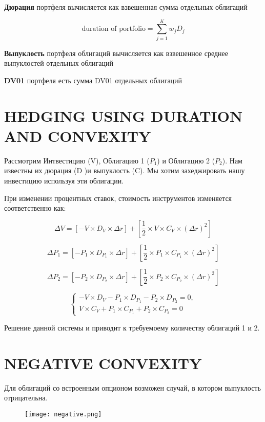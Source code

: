 \documentclass[a4paper,12pt]{article}
\begin{document}
\textbf{Дюрация} портфеля вычисляется как взвешенная сумма отдельных облигаций

\[ \text{duration of portfolio} = \sum_{j=1}^{K} w_j D_j \]

\textbf{Выпуклость} портфеля облигаций вычисляется как взвешенное среднее выпуклостей отдельных облигаций

\textbf{DV01} портфеля есть сумма  DV01 отдельных облигаций 

\section{HEDGING USING DURATION AND CONVEXITY}

Рассмотрим Интвестицию (V), Облигацию 1 ($P_1$) и Облигацию 2 ($P_2$). Нам известны их дюрация (D )и выпуклость (C). Мы хотим захеджировать нашу инвестицию используя эти облигации.

При изменении процентных ставок, стоимость инструментов изменяется соответственно как:

\[ \Delta V = [-V \times D_V \times \Delta r ] + [\frac{1}{2} \times V \times C_V \times (\Delta r)^2]  \]


\[ \Delta P_1 = [-P_1 \times D_{P_1} \times \Delta r ] + [\frac{1}{2} \times P_1 \times C_{P_1} \times (\Delta r)^2]  \]


\[ \Delta P_2 = [-P_2 \times D_{P_2} \times \Delta r ] + [\frac{1}{2} \times P_2 \times C_{P_2} \times (\Delta r)^2]  \]

\begin{equation*}
 \begin{cases}
     -V \times D_V - P_1 \times D_{P_1} - P_2\times D_{P_2} = 0, 
   \\
   V \times C_V + P_1 \times C_{P_1} + P_2 \times C_{P_2} = 0
 \end{cases}
\end{equation*}

Решение данной системы и приводит к требуемоему количеству облигаций 1 и 2.


\section{NEGATIVE CONVEXITY}

Для облигаций со встроенным опционом возможен случай, в котором выпуклость отрицательна.


\begin{figure}[!ht]
    \texttt{[image: negative.png]}
    \caption{}\label{name2}
\end{figure}
\end{document}
